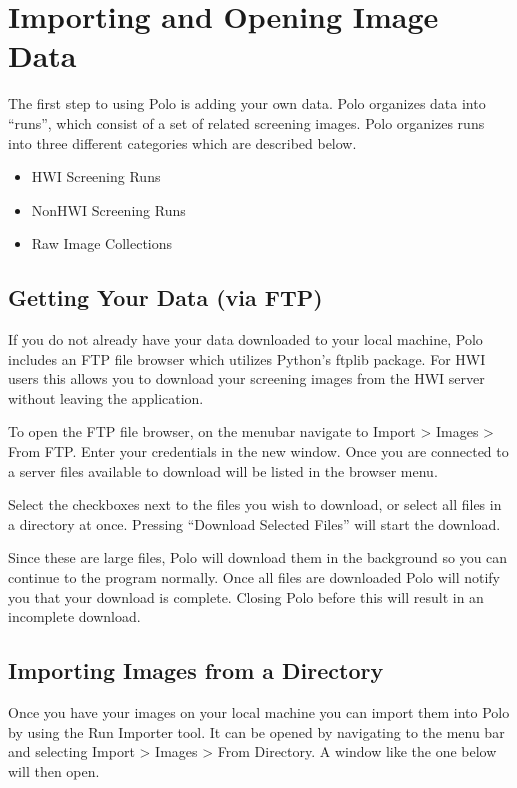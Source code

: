 \documentclass[letterpaper,10pt,english]{sphinxmanual}
\begin{document}
\section{Importing and Opening Image Data}
\label{\detokenize{user_guide:importing-and-opening-image-data}}
The first step to using Polo is adding your own data. Polo organizes data into “runs”, which
consist of a set of related screening images. Polo organizes runs into three different
categories which are described below.
\begin{itemize}
\item {} 
HWI Screening Runs

\item {} 
Non\sphinxhyphen{}HWI Screening Runs

\item {} 
Raw Image Collections

\end{itemize}


\subsection{Getting Your Data (via FTP)}
\label{\detokenize{user_guide:getting-your-data-via-ftp}}
If you do not already have your data downloaded to your local machine, Polo
includes an FTP file browser which utilizes Python’s ftplib package. For
HWI users this allows you to download your screening images from the
HWI server without leaving the application.

To open the FTP file browser, on the menubar navigate to Import \sphinxhyphen{}\textgreater{} Images
\sphinxhyphen{}\textgreater{} From FTP. Enter your credentials in the new window. Once you are
connected to a server files available to download will be listed in the browser menu.


Select the checkboxes next to the files you wish to download, or select
all files in a directory at once. Pressing “Download Selected Files”
will start the download.

Since these are large files, Polo will download them in the background so you
can continue to the program normally. Once all files are downloaded Polo will
notify you that your download is complete. Closing Polo before this will
result in an incomplete download.


\subsection{Importing Images from a Directory}
\label{\detokenize{user_guide:importing-images-from-a-directory}}
Once you have your images on your local machine you can import them into
Polo by using the Run Importer tool. It can be opened by navigating to the
menu bar and selecting Import \sphinxhyphen{}\textgreater{} Images \sphinxhyphen{}\textgreater{} From Directory. A window like
the one below will then open.
\end{document}
